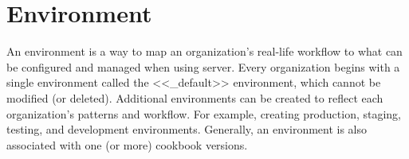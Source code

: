 \section{Environment}

An environment is a way to map an organization's real-life workflow to what can be configured and managed when using server. Every organization begins with a single environment called the <<\_default>> environment, which cannot be modified (or deleted). Additional environments can be created to reflect each organization's patterns and workflow. For example, creating production, staging, testing, and development environments. Generally, an environment is also associated with one (or more) cookbook versions.

